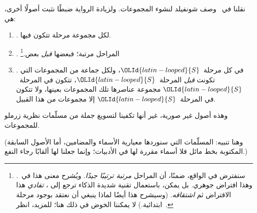 \documentclass[../../../include/open-logic-section]{subfiles}
\begin{document}
	
نقلنا في~ وصف شونفيلد لنشوء المجموعات.
ولزيادة الرواية ضبطًا نثبت أصولًا أخرى، هي:
\begin{enumerate}
\item[] \stageshier. لكل مجموعة مرحلة تتكون فيها.
\item[] \stagesord. المراحل مرتبة؛ فبعضها \emph{قبل}
بعض.\footnote{سنفترض في الواقع، ضمنًا، أن المراحل \emph{مرتبة
  ترتيبًا جيدًا}. ويُشرح معنى هذا في~.
  وهذا افتراض جوهري. بل يمكن، باستعمال تقنية شديدة الذكاء ترجع إلى
  \citet{Scott1974}، \emph{تفادي} هذا الافتراض ثم \emph{اشتقاقه}.
  (وسيشرح هذا أيضًا لماذا ينبغي أن نعتقد بوجود مرحلة ابتدائية.) لا
  يمكننا الخوض في ذلك هنا؛ للمزيد، انظر~\citet{ButtonLT1}.}
\item[] \stagesacc. في كل مرحلة~$\OLId{latin-looped}{S}$، ولكل جماعة من المجموعات التي تكونت
  \emph{قبل} المرحلة~$\OLId{latin-looped}{S}$، تتكون في المرحلة~$\OLId{latin-looped}{S}$ مجموعة عناصرها تلك
  المجموعات بعينها، ولا تتكون في المرحلة~$\OLId{latin-looped}{S}$ إلا مجموعات من هذا القبيل.
\end{enumerate}
وهذه أصول غير صورية، غير أنها تكفينا لتسويغ جملة من مسلّمات نظرية
زرملو للمجموعات.

(وهنا تنبيه: المسلّمات التي سنوردها معيارية الأسماء والمضامين، أما
الأصول السابقة المكتوبة بخط مائل فلا أسماء مقررة لها في الأدبيات؛
وإنما جعلنا لها ألقابًا رجاء النفع.)
\end{document}

